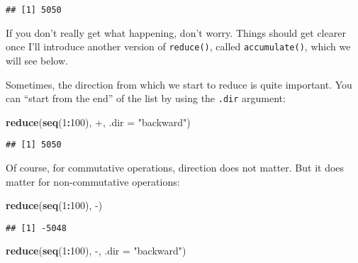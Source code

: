 \documentclass[
]{article}
\newenvironment{Shaded}{\begin{snugshade}}{\end{snugshade}}
\newcommand{\DataTypeTok}[1]{\textcolor[rgb]{0.13,0.29,0.53}{#1}}
\newcommand{\DecValTok}[1]{\textcolor[rgb]{0.00,0.00,0.81}{#1}}
\newcommand{\KeywordTok}[1]{\textcolor[rgb]{0.13,0.29,0.53}{\textbf{#1}}}
\newcommand{\NormalTok}[1]{#1}
\newcommand{\OperatorTok}[1]{\textcolor[rgb]{0.81,0.36,0.00}{\textbf{#1}}}
\newcommand{\StringTok}[1]{\textcolor[rgb]{0.31,0.60,0.02}{#1}}
\begin{document}
\begin{verbatim}
## [1] 5050
\end{verbatim}

If you don't really get what happening, don't worry. Things should get clearer once I'll introduce
another version of \texttt{reduce()}, called \texttt{accumulate()}, which we will see below.

Sometimes, the direction from which we start to reduce is quite important. You can ``start from the
end'' of the list by using the \texttt{.dir} argument:

\begin{Shaded}
\begin{Highlighting}[]
\KeywordTok{reduce}\NormalTok{(}\KeywordTok{seq}\NormalTok{(}\DecValTok{1}\OperatorTok{:}\DecValTok{100}\NormalTok{), }\StringTok{\textasciigrave{}}\DataTypeTok{+}\StringTok{\textasciigrave{}}\NormalTok{, }\DataTypeTok{.dir =} \StringTok{"backward"}\NormalTok{)}
\end{Highlighting}
\end{Shaded}

\begin{verbatim}
## [1] 5050
\end{verbatim}

Of course, for commutative operations, direction does not matter. But it does matter for non-commutative
operations:

\begin{Shaded}
\begin{Highlighting}[]
\KeywordTok{reduce}\NormalTok{(}\KeywordTok{seq}\NormalTok{(}\DecValTok{1}\OperatorTok{:}\DecValTok{100}\NormalTok{), }\StringTok{\textasciigrave{}}\DataTypeTok{{-}}\StringTok{\textasciigrave{}}\NormalTok{)}
\end{Highlighting}
\end{Shaded}

\begin{verbatim}
## [1] -5048
\end{verbatim}

\begin{Shaded}
\begin{Highlighting}[]
\KeywordTok{reduce}\NormalTok{(}\KeywordTok{seq}\NormalTok{(}\DecValTok{1}\OperatorTok{:}\DecValTok{100}\NormalTok{), }\StringTok{\textasciigrave{}}\DataTypeTok{{-}}\StringTok{\textasciigrave{}}\NormalTok{, }\DataTypeTok{.dir =} \StringTok{"backward"}\NormalTok{)}
\end{Highlighting}
\end{Shaded}
\end{document}

